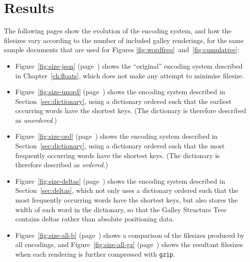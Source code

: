 \clearpage
\section{Results}

The following pages show the evolution of the encoding system, and how the filesizes vary according to the number of included galley renderings, for the same sample documents that are used for Figures \ref{fig:wordfreq}~and~\ref{fig:cumulative}:

\begin{itemize}

 \item Figure~\ref{fig:size-json} (page~\pageref{fig:size-json}) shows the ``original'' encoding system described in Chapter~\ref{ch:floats}, which does not make any attempt to minimise filesize.

 \item Figure~\ref{fig:size-unord} (page~\pageref{fig:size-unord}) shows the encoding system described in Section~\ref{sec:dictionary}, using a dictionary ordered such that the earliest occurring words have the shortest keys. (The dictionary is therefore described as \emph{unordered}.)

 \item Figure~\ref{fig:size-ord} (page~\pageref{fig:size-ord}) shows the encoding system described in Section~\ref{sec:dictionary}, using a dictionary ordered such that the most frequently occurring words have the shortest keys. (The dictionary is therefore described as \emph{ordered}.)

 \item Figure~\ref{fig:size-deltas} (page~\pageref{fig:size-deltas}) shows the encoding system described in Section~\ref{sec:deltas}, which not only uses a dictionary ordered such that the most frequently occurring words have the shortest keys, but also stores the width of each word in the dictionary, so that the Galley Structure Tree contains deltas rather than absolute positioning data.

 \item Figure~\ref{fig:size-all-b} (page~\pageref{fig:size-all-b}) shows a comparison of the filesizes produced by all encodings, and Figure~\ref{fig:size-all-gz} (page~\pageref{fig:size-all-gz}) shows the resultant filesizes when each rendering is further compressed with \texttt{gzip}.
\end{itemize}


